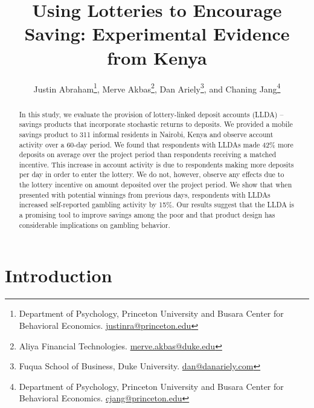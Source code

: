 \documentclass[11pt]{article}
\begin{document}
\title{Using Lotteries to Encourage Saving: Experimental Evidence from Kenya}

\author{Justin Abraham\thanks{Department of Psychology, Princeton University and Busara Center for Behavioral Economics. \protect\href{mailto:justinra@princeton.edu}{justinra@princeton.edu}}, Merve Akbas\thanks{Aliya Financial Technologies. \protect\href{mailto:merve.akbas@duke.edu}{merve.akbas@duke.edu}}, Dan Ariely\thanks{Fuqua School of Business, Duke University. \protect\href{mailto:dan@danariely.com}{dan@danariely.com}}, and Chaning Jang\thanks{Department of Psychology, Princeton University and Busara Center for Behavioral Economics. \protect\href{mailto:cjang@princeton.edu}{cjang@princeton.edu}}} %

\maketitle

\begin{abstract}

	In this study, we evaluate the provision of lottery-linked deposit accounts (LLDA) -- savings products that incorporate stochastic returns to deposits. We provided a mobile savings product to 311 informal residents in Nairobi, Kenya and observe account activity over a 60-day period. We found that respondents with LLDAs made 42\% more deposits on average over the project period than respondents receiving a matched incentive. This increase in account activity is due to respondents making more deposits per day in order to enter the lottery. We do not, however, observe any effects due to the lottery incentive on amount deposited over the project period. We show that when presented with potential winnings from previous days, respondents with LLDAs increased self-reported gambling activity by 15\%. Our results suggest that the LLDA is a promising tool to improve savings among the poor and that product design has considerable implications on gambling behavior.

\end{abstract}

\newpage

\section{Introduction}
\end{document}
